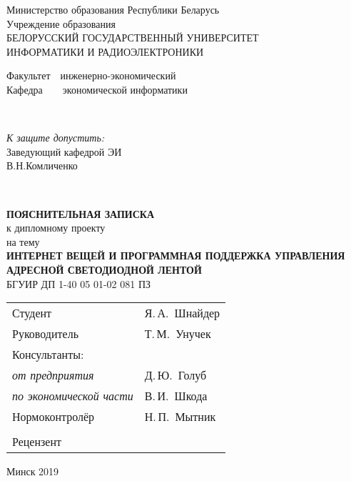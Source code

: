 \begin{titlepage}
  \begin{center}
    Министерство образования Республики Беларусь\\[1em]
    Учреждение образования\\
    БЕЛОРУССКИЙ ГОСУДАРСТВЕННЫЙ УНИВЕРСИТЕТ \\
    ИНФОРМАТИКИ И РАДИОЭЛЕКТРОНИКИ\\[1em]

    \begin{minipage}{\textwidth}
      \begin{flushleft}
          Факультет~~инженерно-экономический\\
          Кафедра~~~~экономической информатики\\
      \end{flushleft}
    \end{minipage}\\[3em]

    \begin{flushright}
      \begin{minipage}{0.45\textwidth}
        \textit{К защите допустить:}\\[0.8em]
        Заведующий кафедрой ЭИ\\[0.45em]
        \underline{\hspace*{2.8cm}} В.Н.Комличенко
      \end{minipage}\\[2.2em]
    \end{flushright}

    \textbf{ПОЯСНИТЕЛЬНАЯ ЗАПИСКА}\\
    {к дипломному проекту}\\
    {на тему}\\[3em]
    \textbf{\large\MakeUppercase{Интернет вещей и программная поддержка управления адресной светодиодной лентой}}\\[1em]


    {БГУИР ДП  1-40 05 01-02 081 ПЗ}\\[2em]
    
    \begin{tabular}{ p{}p{} }
      Студент & Я.\,А.~Шнайдер \\
      Руководитель & Т.\,М.~Унучек \\
      Консультанты: &\\
      \hspace*{3ex}\emph{от предприятия} & Д.\,Ю.~Голуб \\
      \hspace*{3ex}\emph{по экономической части} & В.\,И.~Шкода \\
      Нормоконтролёр & Н.\,П.~Мытник\\
      & \\
      Рецензент &
    \end{tabular}
    
    \vfill
    {\normalsize Минск 2019}
  \end{center}
\end{titlepage}
